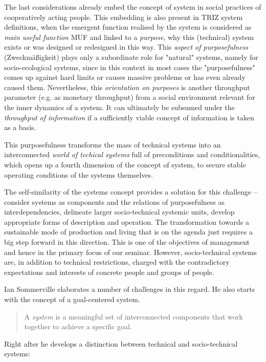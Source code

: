 \documentclass[11pt,a4paper]{article}
\begin{document}
The last considerations already embed the concept of system in social
practices of cooperatively acting people. This embedding is also present in
TRIZ system definitions, when the emergent function realised by the system is
considered as \emph{main useful function} MUF and linked to a \emph{purpose},
why this (technical) system exists or was designed or redesigned in this way.
This \emph{aspect of purposefulness} (Zweckmäßigkeit) plays only a subordinate
role for "natural" systems, namely for socio-ecological systems, since in this
context in most cases the "purposefulness" comes up against hard limits or
causes massive problems or has even already caused them. Nevertheless, this
\emph{orientation on purposes} is another throughput parameter (e.g. as
monetary throughput) from a social environment relevant for the inner dynamics
of a system.  It can ultimately be subsumed under the \emph{throughput of
  information} if a sufficiently viable concept of information is taken as a
basis. 

This purposefulness transforms the mass of technical systems into an
interconnected \emph{world of techical systems} full of preconditions and
conditionalities, which opens up a fourth dimension of the concept of system,
to secure stable operating conditions of the systems themselves.

The self-similarity of the systems concept provides a solution for this
challenge -- consider systems as components and the relations of
purposefulness as interdependencies, delineate larger socio-technical systemic
units, develop appropriate forms of description and operation. The
transformation towards a sustainable mode of production and living that is on
the agenda just requires a big step forward in this direction.  This is one of
the objectives of management and hence in the primary focus of our seminar.
However, socio-technical systems are, in addition to technical restrictions,
charged with the contradictory expectations and interests of concrete people
and groups of people.

Ian Sommerville \cite{Sommerville2015} elaborates a number of challenges in
this regard. He also starts with the concept of a goal-centered system.
\begin{quote}
  A \emph{system} is a meaningful set of interconnected components that work
  together to achieve a specific goal.  \cite{Sommerville2015}
\end{quote}
Right after he develops a distinction between technical and socio-technical
systems:
\end{document}
